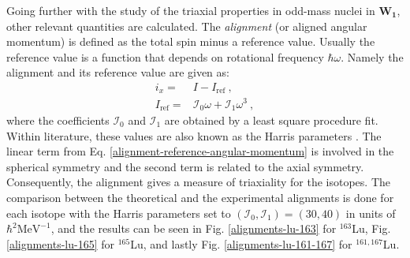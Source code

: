 Going further with the study of the triaxial properties in odd-mass nuclei in $\mathbf{W_1}$, other relevant quantities are calculated. The \emph{alignment} (or aligned angular momentum) is defined as the total spin minus a reference value. Usually the reference value is a function that depends on rotational frequency $\hbar\omega$. Namely the alignment and its reference value are given as:
\begin{align}
    i_x=&I-I_\text{ref}\ ,\nonumber\\
    I_\text{ref}=&\mathcal{I}_0\omega+\mathcal{I}_1\omega^3\ ,
    \label{alignment-reference-angular-momentum}
\end{align}
where the coefficients $\mathcal{I}_0$ and $\mathcal{I}_1$ are obtained by a least square procedure fit. Within literature, these values are also known as the Harris parameters \cite{harris1965higher}. The linear term from Eq. \ref{alignment-reference-angular-momentum} is involved in the spherical symmetry and the second term is related to the axial symmetry. Consequently, the alignment gives a measure of triaxiality for the isotopes. The comparison between the theoretical and the experimental alignments is done for each isotope with the Harris parameters set to $\left(\mathcal{I}_0,\mathcal{I}_1\right)=\left(30,40\right)$ in units of $\hbar^2\text{MeV}^{-1}$, and the results can be seen in Fig. \ref{alignments-lu-163} for $^{163}$Lu, Fig. \ref{alignments-lu-165} for $^{165}$Lu, and lastly Fig. \ref{alignments-lu-161-167} for $^{161,167}$Lu.
